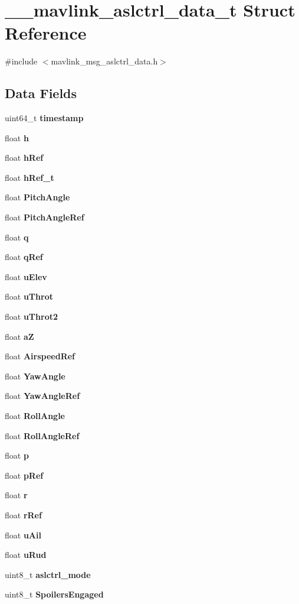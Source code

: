 \section{\+\_\+\+\_\+mavlink\+\_\+aslctrl\+\_\+data\+\_\+t Struct Reference}
\label{struct____mavlink__aslctrl__data__t}


{\ttfamily \#include $<$mavlink\+\_\+msg\+\_\+aslctrl\+\_\+data.\+h$>$}

\subsection*{Data Fields}
\begin{DoxyCompactItemize}
\item 
uint64\+\_\+t \textbf{ timestamp}
\item 
float \textbf{ h}
\item 
float \textbf{ h\+Ref}
\item 
float \textbf{ h\+Ref\+\_\+t}
\item 
float \textbf{ Pitch\+Angle}
\item 
float \textbf{ Pitch\+Angle\+Ref}
\item 
float \textbf{ q}
\item 
float \textbf{ q\+Ref}
\item 
float \textbf{ u\+Elev}
\item 
float \textbf{ u\+Throt}
\item 
float \textbf{ u\+Throt2}
\item 
float \textbf{ aZ}
\item 
float \textbf{ Airspeed\+Ref}
\item 
float \textbf{ Yaw\+Angle}
\item 
float \textbf{ Yaw\+Angle\+Ref}
\item 
float \textbf{ Roll\+Angle}
\item 
float \textbf{ Roll\+Angle\+Ref}
\item 
float \textbf{ p}
\item 
float \textbf{ p\+Ref}
\item 
float \textbf{ r}
\item 
float \textbf{ r\+Ref}
\item 
float \textbf{ u\+Ail}
\item 
float \textbf{ u\+Rud}
\item 
uint8\+\_\+t \textbf{ aslctrl\+\_\+mode}
\item 
uint8\+\_\+t \textbf{ Spoilers\+Engaged}
\end{DoxyCompactItemize}


